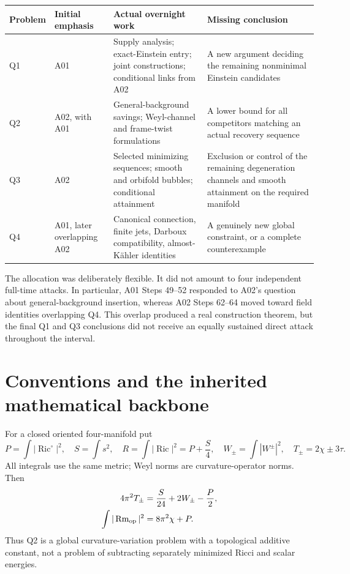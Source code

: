 \documentclass[11pt]{article}
\newcommand{\Ric}{\operatorname{Ric}}
\newcommand{\Rm}{\operatorname{Rm}}
\theoremstyle{remark}
\begin{document}
\begin{center}\small
\begin{tabularx}{\textwidth}{@{}p{}p{}XX@{}}
\toprule
Problem & Initial emphasis & Actual overnight work & Missing conclusion\\
\midrule
Q1 & A01 & Supply analysis; exact-Einstein entry; joint constructions;
conditional links from A02 & A new argument deciding the remaining
nonminimal Einstein candidates\\
Q2 & A02, with A01 & General-background savings; Weyl-channel and
frame-twist formulations & A lower bound for all competitors matching an
actual recovery sequence\\
Q3 & A02 & Selected minimizing sequences; smooth and orbifold bubbles;
conditional attainment & Exclusion or control of the remaining degeneration
channels and smooth attainment on the required manifold\\
Q4 & A01, later overlapping A02 & Canonical connection, finite jets,
Darboux compatibility, almost-K\"ahler identities & A genuinely new global
constraint, or a complete counterexample\\
\bottomrule
\end{tabularx}
\end{center}

The allocation was deliberately flexible. It did not amount to four
independent full-time attacks. In particular, A01 Steps 49--52 responded to
A02's question about general-background insertion, whereas A02 Steps 62--64
moved toward field identities overlapping Q4. This overlap produced a real
construction theorem, but the final Q1 and Q3 conclusions did not receive an
equally sustained direct attack throughout the interval.

\section{Conventions and the inherited mathematical backbone}

For a closed oriented four-manifold put
\[
 P=\int|\Ric^\circ|^2,\quad S=\int s^2,\quad
 R=\int|\Ric|^2=P+\frac S4,\quad
 W_\pm=\int|W^\pm|^2,\quad T_\pm=2\chi\pm3\tau.
\]
All integrals use the same metric; Weyl norms are curvature-operator norms.
Then
\begin{align}
 4\pi^2T_\pm&=\frac S{24}+2W_\pm-\frac P2,\label{eq:cw}\\
 \int|\Rm_{\rm op}|^2&=8\pi^2\chi+P.\label{eq:full}
\end{align}
Thus Q2 is a global curvature-variation problem with a topological additive
constant, not a problem of subtracting separately minimized Ricci and scalar
energies.
\end{document}
